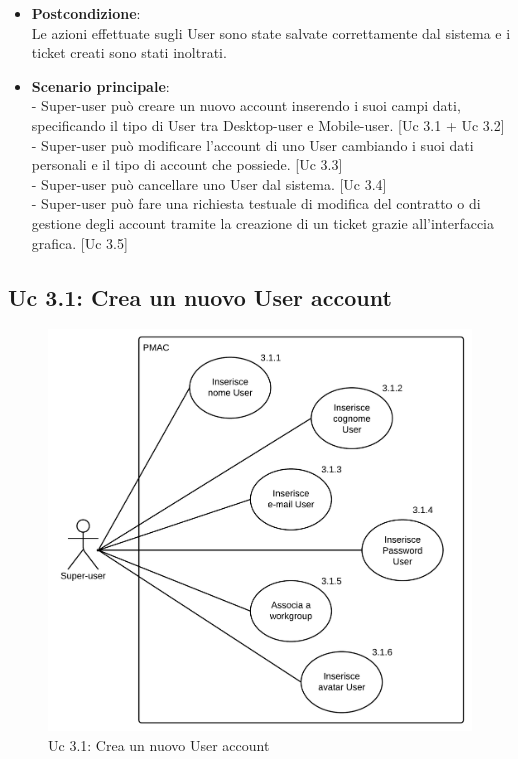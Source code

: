 {\begin{itemize}
\item \textbf{Postcondizione}:\\
Le azioni effettuate sugli User sono state salvate correttamente dal sistema e i ticket creati sono stati inoltrati.

\item \textbf{Scenario principale}:\\
- Super-user può creare un nuovo account inserendo i suoi campi dati, specificando il tipo di User tra Desktop-user e Mobile-user. [Uc 3.1 + Uc 3.2]\\
- Super-user può modificare l'account di uno User cambiando i suoi dati personali e il tipo di account che possiede. [Uc 3.3]\\
- Super-user può cancellare uno User dal sistema. [Uc 3.4]\\
- Super-user può fare una richiesta testuale di modifica del contratto o di gestione degli account tramite la creazione di un ticket grazie all'interfaccia grafica. [Uc 3.5]
\end{itemize}

\newpage

\subsection{Uc 3.1: Crea un nuovo User account}
\begin{figure}[ht]
\centering
\caption{Uc 3.1: Crea un nuovo User account}
\includegraphics[scale=0.9]{images/cap1/UseCase/Uc3_1} %
\end{figure}

}
